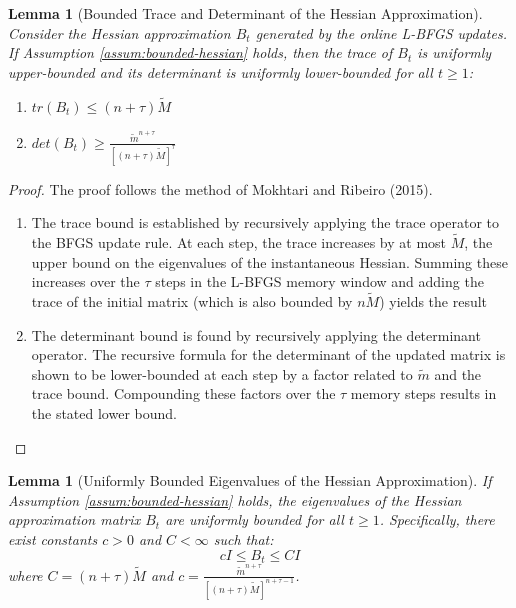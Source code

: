 \documentclass[a4paper,12pt]{article}
\newtheorem{lemma}[theorem]{Lemma}
\begin{document}
\begin{lemma}[Bounded Trace and Determinant of the Hessian Approximation]
\label{lem:trace-det-bound}
Consider the Hessian approximation $B_t$ generated by the online L-BFGS updates. If Assumption \ref{assum:bounded-hessian} holds, then the trace of $B_t$ is uniformly upper-bounded and its determinant is uniformly lower-bounded for all $t \ge 1$:
\begin{enumerate}
    \item $tr(B_t) \le (n+\tau)\tilde{M}$
    \item $det(B_t) \ge \frac{\tilde{m}^{n+\tau}}{[(n+\tau)\tilde{M}]^{\tau}}$
\end{enumerate}
\end{lemma}

\begin{proof}
The proof follows the method of Mokhtari and Ribeiro (2015).
\begin{enumerate}
    \item The trace bound is established by recursively applying the trace operator to the BFGS update rule. At each step, the trace increases by at most $\tilde{M}$, the upper bound on the eigenvalues of the instantaneous Hessian. Summing these increases over the $\tau$ steps in the L-BFGS memory window and adding the trace of the initial matrix (which is also bounded by $n\tilde{M}$) yields the result 
    
    \item The determinant bound is found by recursively applying the determinant operator. The recursive formula for the determinant of the updated matrix is shown to be lower-bounded at each step by a factor related to $\tilde{m}$ and the trace bound. Compounding these factors over the $\tau$ memory steps results in the stated lower bound.
\end{enumerate}
\end{proof}

\begin{lemma}[Uniformly Bounded Eigenvalues of the Hessian Approximation]
\label{lem:eigenvalue-bound}
If Assumption \ref{assum:bounded-hessian} holds, the eigenvalues of the Hessian approximation matrix $B_t$ are uniformly bounded for all $t \ge 1$. Specifically, there exist constants $c>0$ and $C<\infty$ such that:
$$
cI \le B_t \le CI
$$
where $C = (n+\tau)\tilde{M}$ and $c = \frac{\tilde{m}^{n+\tau}}{[(n+\tau)\tilde{M}]^{n+\tau-1}}$.
\end{lemma}
\end{document}
